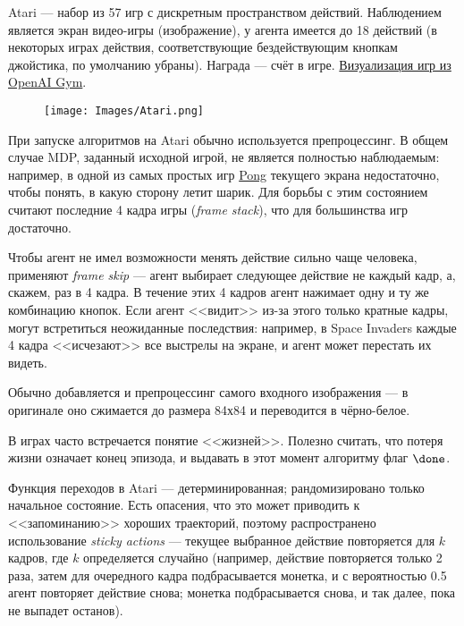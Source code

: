 \begin{example}
Atari --- набор из 57 игр с дискретным пространством действий. Наблюдением является экран видео-игры (изображение), у агента имеется до 18 действий (в некоторых играх действия, соответствующие бездействующим кнопкам джойстика, по умолчанию убраны). Награда --- счёт в игре. \href{https://gym.openai.com/envs/#atari}{Визуализация игр из OpenAI Gym}.

\begin{wrapfigure}{r}{0.4\textwidth}
\centering
\vspace{-0.3cm}
\texttt{[image: Images/Atari.png]}
\vspace{-0.8cm}
\end{wrapfigure}

При запуске алгоритмов на Atari обычно используется препроцессинг. В общем случае MDP, заданный исходной игрой, не является полностью наблюдаемым: например, в одной из самых простых игр \href{https://gym.openai.com/envs/Pong-v0/}{Pong} текущего экрана недостаточно, чтобы понять, в какую сторону летит шарик. Для борьбы с этим состоянием считают последние 4 кадра игры (\emph{frame stack}), что для большинства игр достаточно.

Чтобы агент не имел возможности менять действие сильно чаще человека, применяют \emph{frame skip} --- агент выбирает следующее действие не каждый кадр, а, скажем, раз в 4 кадра. В течение этих 4 кадров агент нажимает одну и ту же комбинацию кнопок. Если агент <<видит>> из-за этого только кратные кадры, могут встретиться неожиданные последствия: например, в Space Invaders каждые 4 кадра <<исчезают>> все выстрелы на экране, и агент может перестать их видеть.

\begin{remark}
Обычно добавляется и препроцессинг самого входного изображения --- в оригинале оно сжимается до размера 84х84 и переводится в чёрно-белое.
\end{remark}

\begin{remark}
В играх часто встречается понятие <<жизней>>. Полезно считать, что потеря жизни означает конец эпизода, и выдавать в этот момент алгоритму флаг $\done$. 
\end{remark}

Функция переходов в Atari --- детерминированная; рандомизировано только начальное состояние. Есть опасения, что это может приводить к <<запоминанию>> хороших траекторий, поэтому распространено использование \emph{sticky actions} --- текущее выбранное действие повторяется для $k$ кадров, где $k$ определяется случайно (например, действие повторяется только 2 раза, затем для очередного кадра подбрасывается монетка, и с вероятностью 0.5 агент повторяет действие снова; монетка подбрасывается снова, и так далее, пока не выпадет останов).


\end{example}
